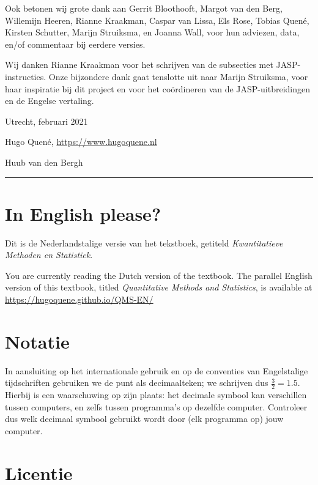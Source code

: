 \documentclass[
]{book}
\begin{document}
Ook betonen wij grote dank aan
Gerrit Bloothooft,
Margot van den Berg,
Willemijn Heeren,
Rianne Kraakman,
Caspar van Lissa,
Els Rose,
Tobias Quené,
Kirsten Schutter,
Marijn Struiksma,
en Joanna Wall,
voor hun adviezen, data, en/of commentaar bij eerdere versies.

Wij danken Rianne Kraakman voor het schrijven van de subsecties met JASP-instructies.
Onze bijzondere dank gaat tenslotte uit naar Marijn Struiksma, voor haar inspiratie bij dit project en voor het coördineren van de JASP-uitbreidingen en de Engelse vertaling.

Utrecht, februari 2021

Hugo Quené, \url{https://www.hugoquene.nl}

Huub van den Bergh

\begin{center}\rule{0.5\linewidth}{0.5pt}\end{center}

\hypertarget{in-english-please}{%
\section*{In English please?}\label{in-english-please}}

Dit is de Nederlandstalige versie van het tekstboek, getiteld \emph{Kwantitatieve Methoden en Statistiek}.

You are currently reading the Dutch version of the textbook.
The parallel English version of this textbook, titled \emph{Quantitative Methods and Statistics}, is available at \url{https://hugoquene.github.io/QMS-EN/}

\hypertarget{notatie}{%
\section*{Notatie}\label{notatie}}

In aansluiting op het internationale gebruik en op de conventies van Engelstalige tijdschriften gebruiken we de punt als decimaalteken; we schrijven dus \(\frac{3}{2}=1.5\). Hierbij is een waarschuwing op zijn plaats: het decimale symbool kan verschillen tussen computers, en zelfs tussen programma's op dezelfde computer. Controleer dus welk decimaal symbool gebruikt wordt door (elk programma op) jouw computer.

\hypertarget{licentie}{%
\section*{Licentie}\label{licentie}}
\end{document}
